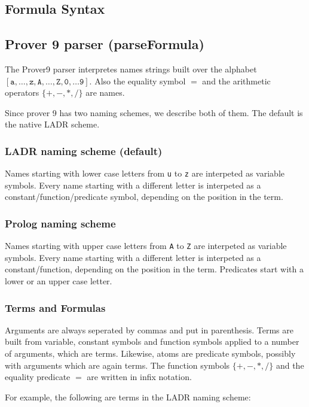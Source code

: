 \documentclass[a4paper,11pt]{article}
\begin{document}
\begin{appendix}
\section{Formula Syntax}
\label{app:formulasyntax}
\subsection{Prover 9 parser (parseFormula)}

The Prover9 parser interpretes names strings built over the alphabet
 $[\mathtt{a, \ldots, z, A ,\ldots, Z, 0, \ldots 9} ]$. Also the
 equality symbol $=$ and the arithmetic operators $\{\mathtt{+,-,*,/}\}$
 are names.

Since prover 9 has two naming schemes, we describe both of them. The default
 is the native LADR scheme.

\subsubsection{LADR naming scheme (default)}

Names starting with lower case letters from \texttt{u} to \texttt{z} are
 interpeted as variable symbols. Every name starting with a different letter
 is interpeted as a constant/function/predicate symbol, depending on the
 position in the term.

\subsubsection{Prolog naming scheme}
Names starting with upper case letters from \texttt{A} to \texttt{Z} are
 interpeted as variable symbols. Every name starting with a different letter
 is interpeted as a constant/function, depending on the
 position in the term. Predicates start with a lower or an upper case letter.

\subsubsection{Terms and Formulas}
Arguments are always seperated by commas and put in parenthesis. Terms are
 built from variable, constant symbols and function symbols applied
 to a number of arguments, which are terms. Likewise, atoms are
 predicate symbols, possibly with arguments which are again terms. The
 function symbols $\{\mathtt{+,-,*,/}\}$ and the equality predicate $=$
 are written in infix notation.

For example, the following are terms in the LADR naming scheme:


\end{appendix}
\end{document}
